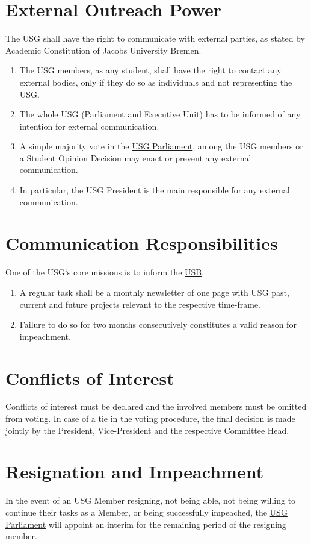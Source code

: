 \documentclass[12pt]{LaTeX_Misc/constitution}
\begin{document}
\section{External Outreach Power}
The USG shall have the right to communicate with external parties, as stated by Academic Constitution of Jacobs University Bremen. 
\begin{enumerate}[label={\textbf{\S\arabic*}}]
\item The USG members, as any student, shall have the right to contact any external bodies, only if they do so as individuals and not representing the USG.
\item The whole USG (Parliament and Executive Unit) has to be informed of any intention for external communication.
\item A simple majority vote in the \hyperref[USGParliamentDef]{USG Parliament}, among the USG members or a Student Opinion Decision may enact or prevent any external communication.
\item In particular, the USG President is the main responsible for any external communication.
\end{enumerate}

\section{Communication Responsibilities}
One of the USG`s core missions is to inform the \hyperref[studentbody]{USB}. 
\begin{enumerate}[label={\textbf{\S\arabic*}}]
    \item A regular task shall be a monthly newsletter of one page with USG past, current and future projects relevant to the respective time-frame.
    \item Failure to do so for two months consecutively constitutes a valid reason for impeachment.
\end{enumerate}

\section{Conflicts of Interest}
Conflicts of interest must be declared and the involved members must be omitted from voting. In case of a tie in the voting procedure, the final decision is made jointly by the President, Vice-President and the respective Committee Head.



\section{Resignation and Impeachment}
In the event of an USG Member resigning, not being able, not being willing to continue their tasks as a Member, or being successfully impeached, the \hyperref[USGParliamentDef]{USG Parliament} will appoint an interim for the remaining period of the resigning member.
\end{document}
